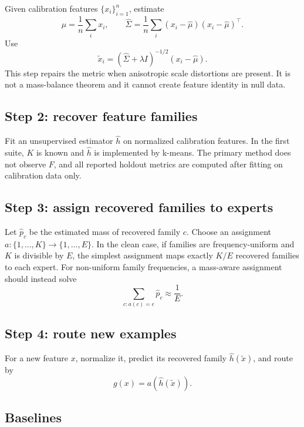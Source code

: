 \documentclass{article}
\begin{document}
Given calibration features \(\{x_i\}_{i=1}^n\), estimate
\[
    \widehat\mu=\frac1n\sum_i x_i,\qquad
    \widehat\Sigma=\frac1n\sum_i(x_i-\widehat\mu)(x_i-\widehat\mu)^\top.
\]
Use
\begin{equation}
    \widetilde x_i=(\widehat\Sigma+\lambda I)^{-1/2}(x_i-\widehat\mu).
    \label{eq:whiten}
\end{equation}
This step repairs the metric when anisotropic scale distortions are present.  It
is not a mass-balance theorem and it cannot create feature identity in null data.

\subsection{Step 2: recover feature families}

Fit an unsupervised estimator \(\widehat h\) on normalized calibration features.
In the first suite, \(K\) is known and \(\widehat h\) is implemented by k-means.
The primary method does not observe \(F\), and all reported holdout metrics are
computed after fitting on calibration data only.

\subsection{Step 3: assign recovered families to experts}

Let \(\widehat p_c\) be the estimated mass of recovered family \(c\).  Choose an
assignment \(a:\{1,\ldots,K\}\to\{1,\ldots,E\}\).  In the clean case, if
families are frequency-uniform and \(K\) is divisible by \(E\), the simplest
assignment maps exactly \(K/E\) recovered families to each expert.  For
non-uniform family frequencies, a mass-aware assignment should instead solve
\begin{equation}
    \sum_{c:a(c)=e}\widehat p_c\approx\frac1E.
    \label{eq:mass_aware}
\end{equation}

\subsection{Step 4: route new examples}

For a new feature \(x\), normalize it, predict its recovered family
\(\widehat h(\widetilde x)\), and route by
\begin{equation}
    g(x)=a(\widehat h(\widetilde x)).
\end{equation}

\subsection{Baselines}
\end{document}

